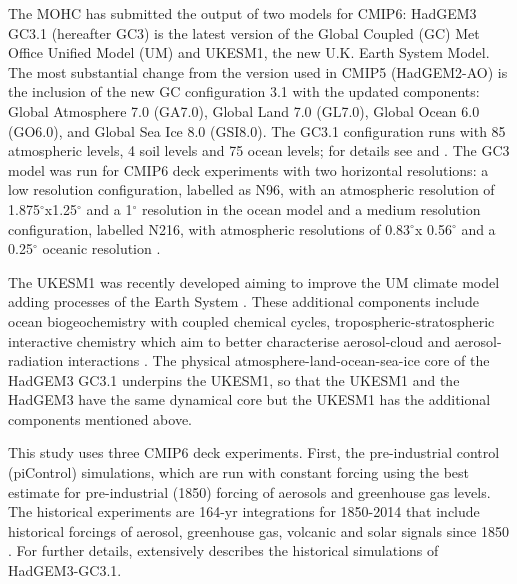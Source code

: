 The MOHC has submitted the output of two models for CMIP6: HadGEM3 GC3.1 
(hereafter GC3) is the latest version of the Global Coupled (GC) Met Office Unified Model (UM) and UKESM1, the new U.K. Earth System Model.
The most substantial change from the version used in CMIP5 (HadGEM2-AO) is the inclusion of the new GC configuration 3.1 \citep{walters2019} with the updated components: Global Atmosphere 7.0 (GA7.0), Global Land 7.0
(GL7.0), Global Ocean 6.0 (GO6.0), and Global Sea Ice 8.0 (GSI8.0).
The GC3.1 configuration runs with 85 atmospheric levels, 4 soil levels and 75 ocean levels; for details see \cite{williams2018} and \cite{kuhlbrodt2018}.
The GC3 model was run for CMIP6 deck experiments with two horizontal resolutions: a low resolution configuration, labelled as N96, with an atmospheric resolution of 1.875$^\circ$x1.25$^\circ$ and a 1$^\circ$ resolution in the ocean model and a medium resolution configuration, labelled N216, with atmospheric resolutions of 0.83$^\circ$x 0.56$^\circ$ and a 0.25$^\circ$ oceanic resolution \citep{menary2018}.

The UKESM1 was recently developed aiming to improve the UM climate model adding processes of the Earth System \citep{sellar2019}. These additional components include ocean biogeochemistry with coupled chemical cycles, tropospheric-stratospheric interactive chemistry which aim to better characterise aerosol-cloud and aerosol-radiation interactions \citep{mulcahy2018,sellar2019}.
The physical atmosphere-land-ocean-sea-ice core of the HadGEM3 GC3.1 underpins the UKESM1, so that the UKESM1 and the HadGEM3 have the same dynamical core but the UKESM1 has the additional components mentioned above.



This study uses three CMIP6 deck experiments. First, the pre-industrial control (piControl) simulations, which are run with constant forcing using the best estimate for pre-industrial (1850) forcing of aerosols and greenhouse gas levels. 
The historical experiments are 164-yr integrations for 1850-2014 that include historical forcings of aerosol, greenhouse gas, volcanic and solar signals since 1850 \citep{eyring2016,andrews2019}. For further details, \cite{andrews2020} extensively describes the historical simulations of HadGEM3-GC3.1. %

